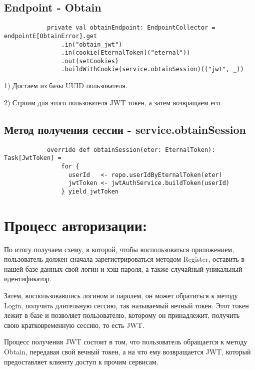\documentclass[14pt]{extarticle}
\begin{document}
    \subsection{Endpoint - Obtain}
    \begin{verbatim}
            private val obtainEndpoint: EndpointCollector = endpointE[ObtainError].get
                .in("obtain_jwt")
                .in(cookie[EternalToken]("eternal"))
                .out(setCookies)
                .buildWithCookie(service.obtainSession)(("jwt", _))
    \end{verbatim}

    1) Достаем из базы UUID пользователя.

    2) Строим для этого пользователя JWT токен, а затем возвращаем его.

    \subsection{Метод получения сессии - service.obtainSession}
    \begin{verbatim}
            override def obtainSession(eter: EternalToken): Task[JwtToken] =
                for {
                  userId   <- repo.userIdByEternalToken(eter)
                  jwtToken <- jwtAuthService.buildToken(userId)
                } yield jwtToken
    \end{verbatim}

    \section{Процесс авторизации:}

    По итогу получаем схему, в которой, чтобы воспользоваться приложением, пользователь должен сначала
    зарегистрироваться методом Register, оставить в нашей базе данных свой логин и хэш пароля, а также случайный уникальный
    идентификатор.

    Затем, воспользовавшись логином и паролем, он может обратиться к методу Login, получить длительную сессию, так
    называемый вечный токен. Этот токен лежит в базе и позволяет пользователю, которому он принадлежит, получить свою
    кратковременную сессию, то есть JWT.

    Процесс получения JWT состоит в том, что пользователь обращается к методу Obtain, передавая свой вечный токен, а
    на что ему возвращается JWT, который предоставляет клиенту доступ к прочим сервисам.
\end{document}
